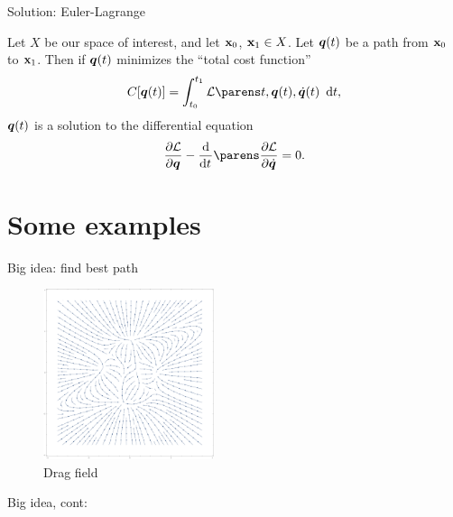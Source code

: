 \documentclass{fkpresentation}
\begin{document}
\begin{frame}{Solution: Euler-Lagrange}
  \begin{theorem}
    Let $X$ be our space of interest, and let $\mathbf{x}_0$, $\mathbf{x}_1 \in X$.
    Let $\bm q(t)$ be a path from $\mathbf{x}_0$ to $\mathbf{x}_1$. Then if $\bm q(t)$
    minimizes the ``total cost function''
    \[
      C[\Qq(t)] = \int_{t_0}^{t_1} \mc L\pn{t, \Qq(t), \dot{\Qq}(t)} \dd
      t,
    \]
    $\bm q(t)$ is a solution to the differential equation
    \[
      \pd{\mc L}{\Qq} - \od{}{t} \pn{\pd{\mc L}{\dot{\Qq}}} = 0.
    \]
  \end{theorem}
\end{frame}

\section{Some examples}

\begin{frame}{Big idea: find best path}
  \begin{figure}[h]
    \centering
    \includegraphics[keepaspectratio,height=5cm]{figures/vector-field.pdf}
    \caption{Drag field}
    \label{fig:wind}
  \end{figure}
\end{frame}

\begin{frame}{Big idea, cont:}
  \begin{figure}[h]
    \vfill
    \centering
    \vfill
  \end{figure}
\end{frame}
\end{document}
